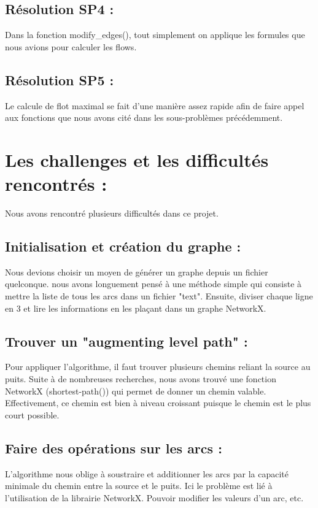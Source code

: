 \documentclass[a4paper, 11pt, oneside]{article}
\begin{document}
\subsection{Résolution SP4 :}

Dans la fonction modify\_edges(), tout simplement on applique les formules que nous avions pour calculer les flows.

\subsection{Résolution SP5 :}

Le calcule de flot maximal se fait d'une manière assez rapide afin de faire appel aux fonctions que nous avons cité dans les sous-problèmes précédemment.

\section{\textbf{Les challenges et les difficultés rencontrés :}}

Nous avons rencontré plusieurs difficultés dans ce projet.

\subsection{Initialisation et création du graphe :}
Nous devions choisir un moyen de générer un graphe depuis un fichier quelconque. nous avons longuement pensé à une méthode simple qui consiste à mettre la liste de tous les arcs dans un fichier "text". Ensuite, diviser chaque ligne en 3 et lire les informations en les plaçant dans un graphe NetworkX.

\subsection{Trouver un "augmenting level path" :}
Pour appliquer l'algorithme, il faut trouver plusieurs chemins reliant la source au puits. Suite à de nombreuses recherches, nous avons trouvé une fonction NetworkX (shortest-path()) qui permet de donner un chemin valable. Effectivement, ce chemin est bien à niveau croissant puisque le chemin est le plus court possible.

\subsection{Faire des opérations sur les arcs :}
L'algorithme nous oblige à soustraire et additionner les arcs par la capacité minimale du chemin entre la source et le puits. Ici le problème est lié à l'utilisation de la librairie NetworkX. Pouvoir modifier les valeurs d'un arc, etc.
\end{document}

